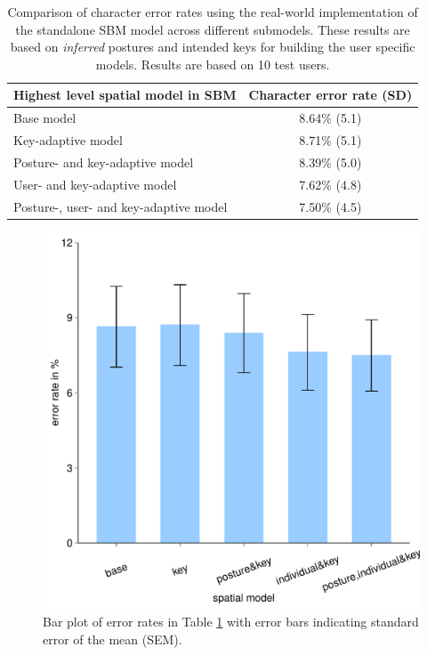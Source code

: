 \documentclass{sigchi}
\newcommand\tabhead[1]{\small\textbf{#1}}
\begin{document}
\begin{table}[tb]
  \centering
  \begin{tabular}{|l|c|}
  \hline
  \tabhead{Highest level spatial model in SBM} &  
  \multicolumn{1}{|p{0.2\columnwidth}|}{\centering\tabhead{Character error rate
  (SD)}}
  \\
  \hline
 Base model & 8.64\% (5.1)\\
  \hline
  Key-adaptive model & 8.71\% (5.1) \\
  \hline
    \multicolumn{1}{|p{0.7\columnwidth}|}{Posture- and key-adaptive model} &
    8.39\% (5.0)\\
  \hline
  User- and key-adaptive model  & 7.62\% (4.8)
  \\
  \hline
  Posture-, user- and key-adaptive model &  7.50\% (4.5)
  \\
  \hline
  \end{tabular}
  \caption{Comparison of character error rates using the real-world implementation of the standalone SBM model across different submodels.  
  These results are based on \textit{inferred} postures and intended keys for
  building the user specific models. Results are based on 10 test users.}
  \label{tab:off-device}
\end{table}

\begin{figure}[tb]
  \centering
  \includegraphics[width=1\columnwidth,
  height=0.7\columnwidth]{figures/error-rates2-embed-font.pdf}
  \caption{Bar plot of error rates in Table \ref{tab:off-device} with error
  bars indicating standard error of the mean (SEM).}
  \label{fig:error-bar2}
\end{figure}
\end{document}
